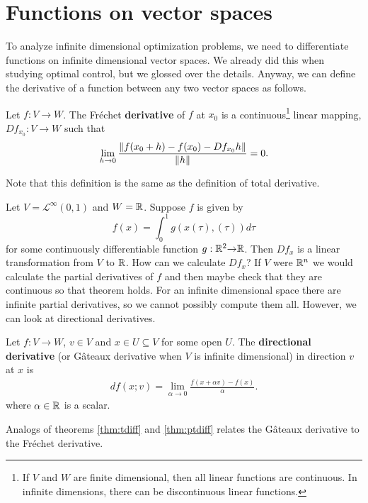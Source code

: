 \section{Functions on vector spaces}
To analyze infinite dimensional optimization problems, we need to
differentiate functions on infinite dimensional vector spaces. We
already did this when studying optimal control, but we glossed over
the details. Anyway, we can define the derivative of a function
between any two vector spaces as follows. 
\begin{definition}
  Let $f: V \to W$. The Fr\'{e}chet \textbf{derivative} of $f$ at
  $x_0$ is a continuous\footnote{If $V$
    and $W$ are finite dimensional, then all linear functions are
    continuous. In infinite dimensions, there can be discontinuous
    linear functions.} linear mapping, $Df_{x_0}: V \to W$ such that
  \begin{align*}
    \lim_{h {\rightarrow} 0} \frac{\left\Vert f(x_0 + h) - f(x_0) - Df_{x_0}
        h\right\Vert} {\left\Vert {h} \right\Vert} = 0. 
  \end{align*}
\end{definition}
Note that this definition is the same as the definition of total
derivative. 
\begin{example}\label{ex:fre}
  Let $V = \mathcal{L}^\infty(0,1)$ and $W = \mathbb{R}$. Suppose $f$ is given by
  \[ f(x) = \int_0^1 g(x(\tau),(\tau)) d\tau \] 
  for some continuously differentiable function $g:\mathbb{R}^2 {\rightarrow}
  \mathbb{R}$. 
  Then $Df_{x}$ is a linear transformation from $V$ to $\mathbb{R}$. How
  can we calculate $Df_x$? If $V$ were $\mathbb{R}^n$ we would calculate the
  partial derivatives of $f$ and then maybe check that they are
  continuous so that theorem \label{thm:ptdiff} holds. For an infinite
  dimensional space there are infinite partial derivatives, so we
  cannot possibly compute them all. However, we can look at
  directional derivatives. 
\end{example}
\begin{definition}
  Let $f: V \to W$, $v \in V$ and $x \in U \subseteq V$ for some open
  $U$. The \textbf{directional derivative} (or G\^{a}teaux derivative
  when $V$ is infinite dimensional)  in direction $v$ at $x$ is
  \begin{align*}
    df(x;v) = \lim_{\alpha \to 0} \frac{f(x + \alpha v) - f(x)}{\alpha}.
  \end{align*}  
  where $\alpha \in \mathbb{R}$ is a scalar.
\end{definition}
Analogs of theorems \ref{thm:tdiff} and \ref{thm:ptdiff} relates the
G\^{a}teaux derivative to the Fr\'{e}chet derivative.
